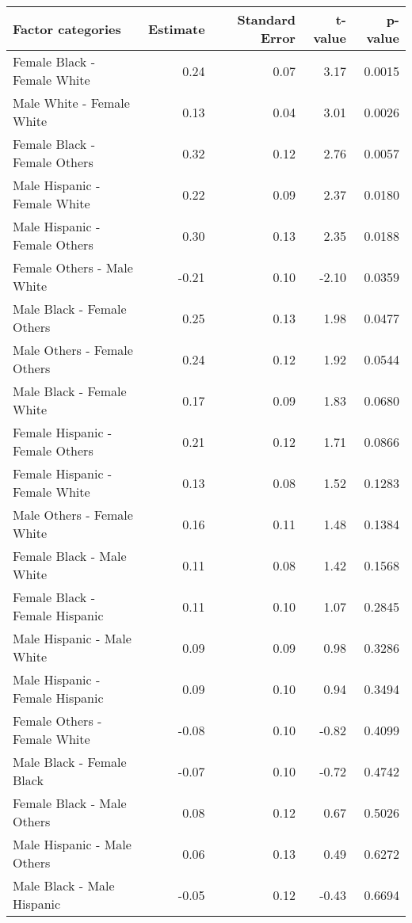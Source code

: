 \begin{table}[H]
\footnotesize
\centering
\begin{tabular}{lrrrr}
  \hline
  Factor categories & Estimate & Standard Error & t-value & p-value \\ 
  \hline
    Female Black -  Female White & 0.24 & 0.07 & 3.17 & 0.0015 \\ 
    Male White -  Female White & 0.13 & 0.04 & 3.01 & 0.0026 \\ 
    Female Black -  Female Others & 0.32 & 0.12 & 2.76 & 0.0057 \\ 
    Male Hispanic -  Female White & 0.22 & 0.09 & 2.37 & 0.0180 \\ 
    Male Hispanic -  Female Others & 0.30 & 0.13 & 2.35 & 0.0188 \\ 
    Female Others -  Male White & -0.21 & 0.10 & -2.10 & 0.0359 \\ 
    Male Black -  Female Others & 0.25 & 0.13 & 1.98 & 0.0477 \\ 
    Male Others -  Female Others & 0.24 & 0.12 & 1.92 & 0.0544 \\ 
    Male Black -  Female White & 0.17 & 0.09 & 1.83 & 0.0680 \\ 
    Female Hispanic -  Female Others & 0.21 & 0.12 & 1.71 & 0.0866 \\ 
    Female Hispanic -  Female White & 0.13 & 0.08 & 1.52 & 0.1283 \\ 
    Male Others -  Female White & 0.16 & 0.11 & 1.48 & 0.1384 \\ 
    Female Black -  Male White & 0.11 & 0.08 & 1.42 & 0.1568 \\ 
    Female Black -  Female Hispanic & 0.11 & 0.10 & 1.07 & 0.2845 \\ 
    Male Hispanic -  Male White & 0.09 & 0.09 & 0.98 & 0.3286 \\ 
    Male Hispanic -  Female Hispanic & 0.09 & 0.10 & 0.94 & 0.3494 \\ 
    Female Others -  Female White & -0.08 & 0.10 & -0.82 & 0.4099 \\ 
    Male Black -  Female Black & -0.07 & 0.10 & -0.72 & 0.4742 \\ 
    Female Black -  Male Others & 0.08 & 0.12 & 0.67 & 0.5026 \\ 
    Male Hispanic -  Male Others & 0.06 & 0.13 & 0.49 & 0.6272 \\ 
    Male Black -  Male Hispanic & -0.05 & 0.12 & -0.43 & 0.6694 \\ 

\end{tabular}
\end{table}
